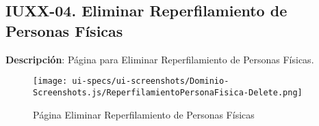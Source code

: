 \clearpage
\subsection{IUXX-04. Eliminar Reperfilamiento de Personas F\'isicas} \label{sec:ui-page-delete-reperfilamientopersonafisica}

\textbf{Descripci\'on}: P\'agina para Eliminar Reperfilamiento de Personas F\'isicas.\\

\begin{figure}[H]
	\label{tab:ui-delete-reperfilamientopersonafisica-page}
	\texttt{[image: ui-specs/ui-screenshots/Dominio-Screenshots.js/ReperfilamientoPersonaFisica-Delete.png]}
	\caption{P\'agina Eliminar Reperfilamiento de Personas F\'isicas}
\end{figure}

